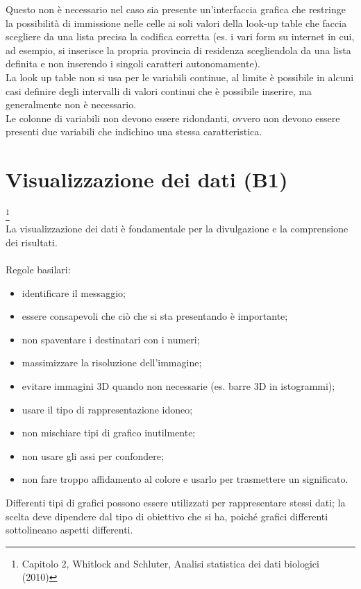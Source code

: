 \documentclass[10pt, draft]{book}
\newcommand{\tightlist}{%
\setlength{\itemsep}{1pt}\setlength{\parskip}{0pt}\setlength{\parsep}{0pt}}
\begin{document}
Questo non è necessario nel caso sia presente un'interfaccia grafica che restringe la possibilità di immissione nelle celle ai soli valori della look-up table che faccia scegliere da una lista precisa la codifica corretta (es. i vari form su internet in cui, ad esempio, si inserisce la propria provincia di residenza scegliendola da una lista definita e non inserendo i singoli caratteri autonomamente).
\\
La look up table non si usa per le variabili continue, al limite è possibile in alcuni casi definire degli intervalli di valori continui che è possibile inserire, ma generalmente non è necessario.
\\
Le colonne di variabili non devono essere ridondanti, ovvero non devono essere presenti due variabili che indichino una stessa caratteristica.

\chapter{Visualizzazione dei dati (B1)}\footnote{Capitolo 2, Whitlock and Schluter, Analisi statistica dei dati biologici (2010)}
\\
La visualizzazione dei dati è fondamentale per la divulgazione e la comprensione dei risultati.
\\
\\
Regole basilari:
\begin{itemize} \tightlist
    \item identificare il messaggio;
    \item essere consapevoli che ciò che si sta presentando è importante;
    \item non spaventare i destinatari con i numeri;
    \item massimizzare la risoluzione dell'immagine;
    \item evitare immagini 3D quando non necessarie (es. barre 3D in istogrammi);
    \item usare il tipo di rappresentazione idoneo;
    \item non mischiare tipi di grafico inutilmente;
    \item non usare gli assi per confondere;
    \item non fare troppo affidamento al colore e usarlo per trasmettere un significato.
\end{itemize}
Differenti tipi di grafici possono essere utilizzati per rappresentare stessi dati; la scelta deve dipendere dal tipo di obiettivo che si ha, poiché grafici differenti sottolineano aspetti differenti.
\end{document}
